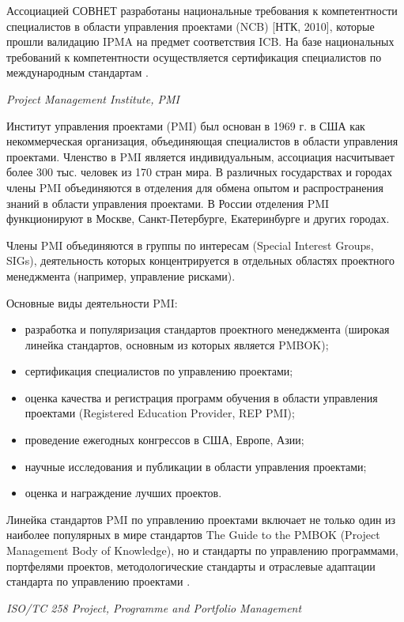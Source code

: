 Ассоциацией СОВНЕТ разработаны национальные требования к компетентности специалистов в области управления проектами (NCB) [НТК, 2010], которые прошли валидацию IPMA на предмет соответствия ICB. На базе национальных требований к компетентности осуществляется сертификация специалистов по международным стандартам \cite[35]{aleshin}.

\textit{Project Management Institute, PMI}

Институт управления проектами (PMI) был основан в 1969 г. в США как некоммерческая организация, объединяющая специалистов в области управления проектами.
Членство в PMI является индивидуальным, ассоциация насчитывает более 300 тыс. человек из 170 стран мира.
В различных государствах и городах члены PMI объединяются в отделения для обмена опытом и распространения знаний в области управления проектами.
В России отделения PMI функционируют в Москве, Санкт-Петербурге, Екатеринбурге и других городах.

Члены PMI объединяются в группы по интересам (Special Interest Groups, SIGs), деятельность которых концентрируется в отдельных областях проектного менеджмента (например, управление рисками).

Основные виды деятельности PMI:
\begin{itemize}
	\item разработка и популяризация стандартов проектного менеджмента (широкая линейка стандартов, основным из которых является PMBOK);
	\item сертификация специалистов по управлению проектами;
	\item оценка качества и регистрация программ обучения в области управления проектами (Registered Education Provider, REP PMI);
	\item проведение ежегодных конгрессов в США, Европе, Азии;
	\item научные исследования и публикации в области управления проектами;
	\item оценка и награждение лучших проектов.
\end{itemize}

Линейка стандартов PMI по управлению проектами включает не только один из наиболее популярных в мире стандартов The Guide to the PMBOK (Project Management Body of Knowledge), но и стандарты по управлению программами, портфелями проектов, методологические стандарты и отраслевые адаптации стандарта по управлению проектами \cite[36]{aleshin}.

\textit{ISO/TC 258 Project, Programme and Portfolio Management}

